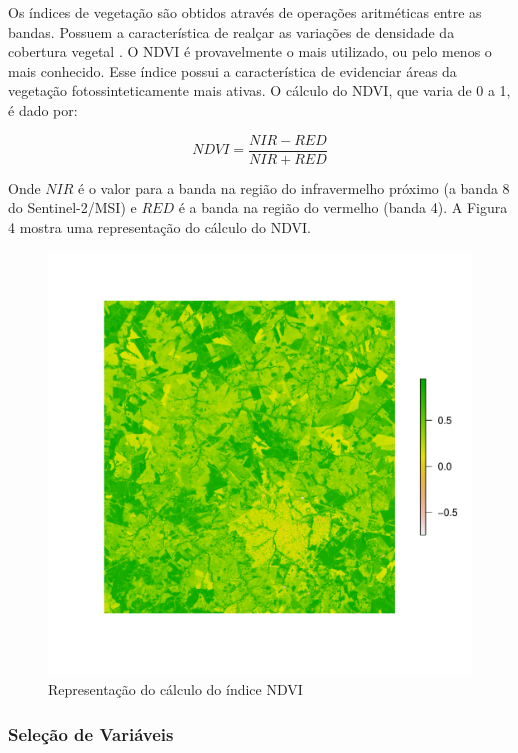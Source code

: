 	Os índices de vegetação são obtidos através de operações aritméticas
entre as bandas. Possuem a característica de realçar as variações de
densidade da cobertura vegetal \cite{meneses2012introduccao}. O NDVI é provavelmente o mais utilizado, ou pelo menos o mais conhecido. Esse índice possui a característica de evidenciar áreas da vegetação fotossinteticamente mais ativas. O cálculo do NDVI, que varia de 0 a 1, é dado por: 

\begin{equation}
NDVI = \frac{NIR - RED}{NIR + RED}
\end{equation}

Onde $NIR$ é o valor para a banda na região do infravermelho próximo
(a banda 8 do Sentinel-2/MSI) e $RED$ é a banda na região do vermelho (banda 4). A Figura 4 mostra uma representação do cálculo do \acs{NDVI}.

\begin{figure}[H]
    \centering
    \caption{Representação do cálculo do índice NDVI} \label{fig-fluxograma}
    \includegraphics[scale=0.7]{figs/plot_ndvi.pdf}
\end{figure}

\subsubsection{Seleção de Variáveis}\label{selecao-de-variaveis}

